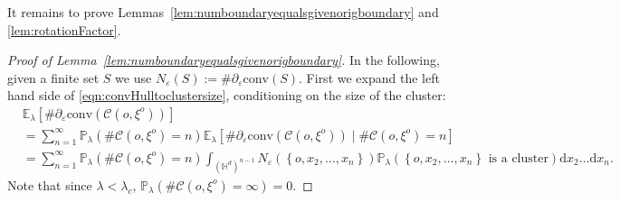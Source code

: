 \documentclass[10pt,a4paper,dvipsnames]{article}
\theoremstyle{definition}
\theoremstyle{remark}
\newcommand{\pla}{\mathbb P_\lambda}
\newcommand{\ela}{\mathbb E_{\lambda}}
\newcommand{\HypDim}{{\mathbb{H}^d}}
\newcommand{\dd}{\mathrm{d}} %
\newcommand{\C}{\mathscr {C}}
\newcommand{\convex}[1]{{\mathrm{conv}\left(#1\right)}}
\newcommand{\orig}{o}
\numberwithin{equation}{section}
\begin{document}
It remains to prove Lemmas~\ref{lem:numboundaryequalsgivenorigboundary} and \ref{lem:rotationFactor}.
\begin{proof}[Proof of Lemma~\ref{lem:numboundaryequalsgivenorigboundary}]
In the following, given a finite set $S$ we use $N_\varepsilon(S):= \#\partial_\varepsilon\convex{S}$.
First we expand the left hand side of \eqref{eqn:convHulltoclustersize}, conditioning on the size of the cluster:
    \begin{align}
        &\ela\left[\#\partial_\varepsilon\convex{\C\left(\orig,\xi^\orig\right)}\right]\nonumber\\
        &= \sum_{n=1}^\infty \pla\left(\#\C\left(\orig,\xi^\orig\right)=n\right)\ela\left[\#\partial_\varepsilon\convex{\C\left(\orig,\xi^\orig\right)}\mid \#\C\left(\orig,\xi^\orig\right)=n\right]\nonumber\\
        &= \sum_{n=1}^\infty \pla\left(\#\C\left(\orig,\xi^\orig\right)=n\right) \int_{\left(\HypDim\right)^{n-1}}N_\varepsilon\left(\left\{\orig,x_2,\ldots,x_n\right\}\right)\pla\left(\left\{\orig,x_2,\ldots,x_n\right\}\text{ is a cluster}\right)\dd x_2\ldots \dd x_n.
    \end{align}
    Note that since $\lambda<\lambda_c$, $\pla\left(\#\C\left(\orig,\xi^\orig\right)=\infty\right)=0$.


\end{proof}
\end{document}
